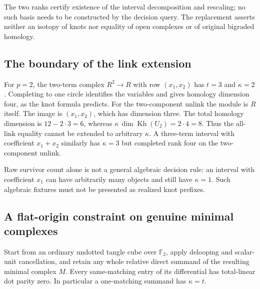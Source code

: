The two ranks certify existence of the interval decomposition and
rescaling; no such basis needs to be constructed by the decision query.
The replacement asserts neither an isotopy of knots nor equality of
open complexes or of original bigraded homology.

\subsection{The boundary of the link extension}

For $p=2$, the two-term complex $R^2\to R$ with row $(x_1,x_2)$ has
$t=3$ and $\kappa=2$. Completing to one circle identifies the variables
and gives homology dimension four, as the knot formula predicts.
For the two-component unlink the module is $R$ itself. The image is
$(x_1,x_2)$, which has dimension three. The total homology dimension is
$12-2\cdot3=6$, whereas
$\kappa\,\dim\operatorname{Kh}(U_2)=2\cdot4=8$.
Thus the all-link equality cannot be extended to arbitrary $\kappa$.
A three-term interval with coefficient $x_1+x_2$ similarly has
$\kappa=3$ but completed rank four on the two-component unlink.

Raw survivor count alone is not a general algebraic decision rule:
an interval with coefficient $x_1$ can have arbitrarily many objects
and still have $\kappa=1$. Such algebraic fixtures must not be
presented as realized knot prefixes.

\subsection{A flat-origin constraint on genuine minimal complexes}

\begin{proposition}
\label{prop:first-jet-flat-origin}
Start from an ordinary undotted tangle cube over $\mathbb F_2$, apply
delooping and scalar-unit cancellation, and retain any whole relative
direct summand of the resulting minimal complex $M$. Every same-matching
entry of its differential has total-linear dot parity zero.
In particular a one-matching summand has $\kappa=t$.
\end{proposition}

